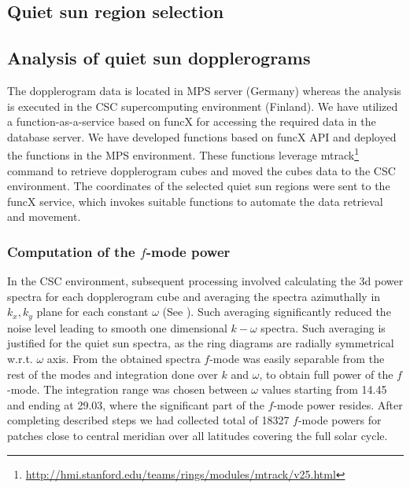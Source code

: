 \documentclass{aa}
\begin{document}
\subsection{Quiet sun region selection}

\subsection{Analysis of quiet sun dopplerograms}
The dopplerogram data is located in MPS server (Germany) whereas the analysis is executed in the CSC supercomputing environment (Finland). We have utilized  a function-as-a-service based on funcX \cite[]{chard20funcx} for accessing the required data in the database server. We have developed functions based on funcX API and deployed the functions in the MPS environment. These functions leverage mtrack\footnote{\url{http://hmi.stanford.edu/teams/rings/modules/mtrack/v25.html}} command to retrieve dopplerogram cubes and moved the cubes data to the CSC environment. The coordinates of the selected quiet sun regions were sent to the funcX service, which invokes suitable functions to automate the data retrieval and movement.

\subsubsection*{Computation of the $f$-mode power}

In the CSC environment, subsequent processing involved calculating the 3d power spectra for each dopplerogram cube and averaging the spectra azimuthally in $k_x, k_y$ plane for each constant $\omega$ (See ). Such averaging significantly reduced the noise level leading to smooth one dimensional $k-\omega$ spectra. Such averaging is justified for the quiet sun spectra, as the ring diagrams are radially symmetrical w.r.t. $\omega$ axis. From the obtained spectra $f$-mode was easily separable from the rest of the modes and integration done over $k$ and $\omega$, to obtain full power of the $f$-mode. The integration range was chosen between $\omega$ values starting from 14.45 and ending at 29.03, where the significant part of the $f$-mode power resides. After completing described steps we had collected total of 18327 $f$-mode powers for patches close to central meridian over all latitudes covering the full solar cycle.
\end{document}
